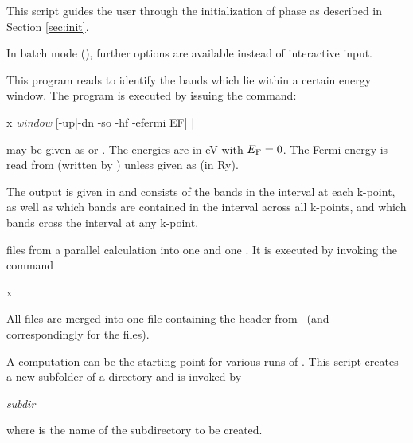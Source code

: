 
This script guides the user through the initialization of \wtow phase
as described in Section \ref{sec:init}.
%
\begin{usage}
\end{usage}
%
In batch mode (), further options are available instead of
interactive input.



This program reads  to identify the bands which
lie within a certain energy window. The program \findbands is
executed by issuing the command:
%
\begin{usage}
  x \findbands \textit{window} [-up|-dn -so -hf -efermi EF]
  |
  \\
  \findbands {}
\end{usage}
%
 may be given as  or
.  The energies are in eV with $E_\text F = 0$.  The
Fermi energy is read from  (written by \prepwiiw)
unless given as  (in Ry).

The output is given in  and consists of the
bands in the interval at each k-point, as well as which bands are
contained in the interval across all k-points, and which bands cross
the interval at any k-point.



 files from a parallel calculation into one
 and one .  It is executed by
invoking the command
%
\begin{usage}
  x \joinvec [-up|-dn -c -so]
\end{usage}
%
All  files are merged into one
 file containing the header from
~(and correspondingly for the  files).



A \wien computation can be the starting point for various runs of
\wtow. This script creates a new subfolder of a \wien directory and is
invoked by
%
\begin{usage}
  \prepwiiw \textit{subdir}
\end{usage}
%
where  is the name of the subdirectory to be created.


